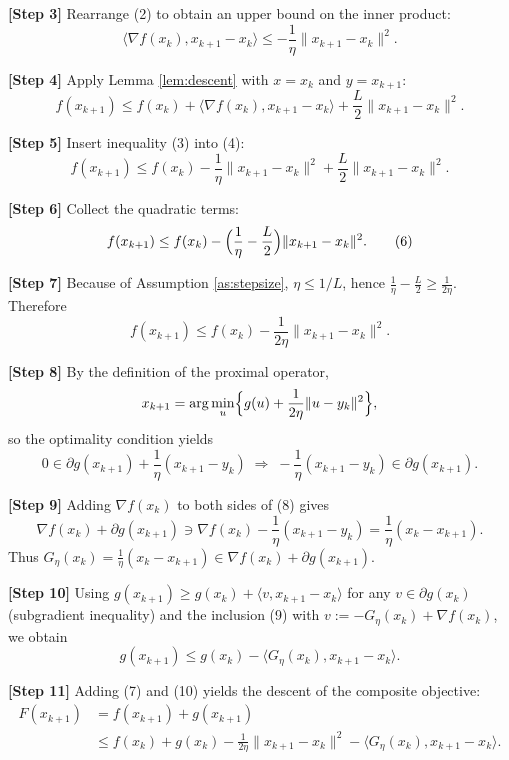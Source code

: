 \documentclass[11pt]{article}
\begin{document}
\noindent\textbf{[Step 3]} Rearrange (2) to obtain an upper bound on the inner product:
\[
\langle \nabla f(x_{k}),x_{k+1}-x_{k}\rangle\le -\frac{1}{\eta}\|x_{k+1}-x_{k}\|^{2}.
\tag{3}
\]

\noindent\textbf{[Step 4]} Apply Lemma \ref{lem:descent} with $x=x_{k}$ and $y=x_{k+1}$:
\[
f(x_{k+1})\le f(x_{k})+\langle\nabla f(x_{k}),x_{k+1}-x_{k}\rangle+\frac{L}{2}\|x_{k+1}-x_{k}\|^{2}.
\tag{4}
\]

\noindent\textbf{[Step 5]} Insert inequality (3) into (4):
\[
f(x_{k+1})\le f(x_{k})-\frac{1}{\eta}\|x_{k+1}-x_{k}\|^{2}
+\frac{L}{2}\|x_{k+1}-x_{k}\|^{2}.
\tag{5}
\]

\noindent\textbf{[Step 6]} Collect the quadratic terms:
\[
f(x_{k+1})\le f(x_{k})-\Bigl(\frac{1}{\eta}-\frac{L}{2}\Bigr)\|x_{k+1}-x_{k}\|^{2}.
\tag{6}
\]

\noindent\textbf{[Step 7]} Because of Assumption \ref{as:stepsize}, $\eta\le 1/L$, hence $\frac{1}{\eta}-\frac{L}{2}\ge\frac{1}{2\eta}$. Therefore
\[
f(x_{k+1})\le f(x_{k})-\frac{1}{2\eta}\|x_{k+1}-x_{k}\|^{2}.
\tag{7}
\]

\noindent\textbf{[Step 8]} By the definition of the proximal operator,
\[
x_{k+1}= \arg\min_{u}\Bigl\{ g(u)+\frac{1}{2\eta}\|u-y_{k}\|^{2}\Bigr\},
\]
so the optimality condition yields
\[
0\in \partial g(x_{k+1})+\frac{1}{\eta}(x_{k+1}-y_{k})
\;\Longrightarrow\;
-\frac{1}{\eta}(x_{k+1}-y_{k})\in\partial g(x_{k+1}).
\tag{8}
\]

\noindent\textbf{[Step 9]} Adding $\nabla f(x_{k})$ to both sides of (8) gives
\[
\nabla f(x_{k})+\partial g(x_{k+1})\ni
\nabla f(x_{k})-\frac{1}{\eta}(x_{k+1}-y_{k})
= \frac{1}{\eta}(x_{k}-x_{k+1}) .
\tag{9}
\]
Thus $G_{\eta}(x_{k})=\frac{1}{\eta}(x_{k}-x_{k+1})\in \nabla f(x_{k})+\partial g(x_{k+1})$.

\noindent\textbf{[Step 10]} Using $g(x_{k+1})\ge g(x_{k})+\langle v, x_{k+1}-x_{k}\rangle$ for any $v\in\partial g(x_{k})$ (subgradient inequality) and the inclusion (9) with $v:=-G_{\eta}(x_{k})+\nabla f(x_{k})$, we obtain
\[
g(x_{k+1})\le g(x_{k})-\langle G_{\eta}(x_{k}),x_{k+1}-x_{k}\rangle .
\tag{10}
\]

\noindent\textbf{[Step 11]} Adding (7) and (10) yields the descent of the composite objective:
\[
\begin{aligned}
F(x_{k+1}) &= f(x_{k+1})+g(x_{k+1})\\
&\le f(x_{k})+g(x_{k})-\frac{1}{2\eta}\|x_{k+1}-x_{k}\|^{2}
-\langle G_{\eta}(x_{k}),x_{k+1}-x_{k}\rangle .
\end{aligned}
\tag{11}
\]
\end{document}
